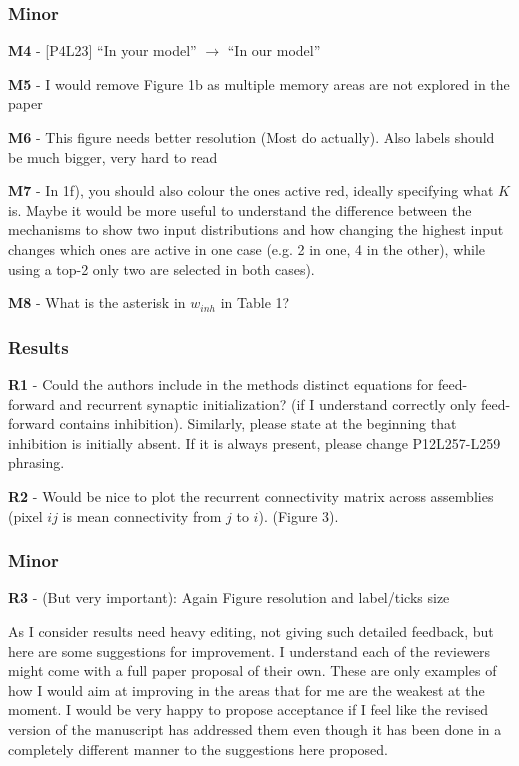 \documentclass[a4paper, 11pt]{article}
\begin{document}
\subsubsection*{Minor}
\textbf{M4} - [P4L23] ``In your model'' $\rightarrow$ ``In our model''

\textbf{M5} - I would remove Figure 1b as multiple memory areas are not explored in the paper

\textbf{M6} - This figure needs better resolution (Most do actually). Also labels should be much bigger, very hard to read

\textbf{M7} - In 1f), you should also colour the ones active red, ideally specifying what $K$ is. Maybe it would be more useful to understand the difference between the mechanisms to show two input distributions and how changing the highest input changes which ones are active in one case (e.g. 2 in one, 4 in the other), while using a top-2 only two are selected in both cases).

\textbf{M8} - What is the asterisk in $w_{inh}$ in Table 1?

\subsubsection*{Results}
\textbf{R1} - Could the authors include in the methods distinct equations for feed-forward and recurrent synaptic initialization? (if I understand correctly only feed-forward contains inhibition). Similarly, please state at the beginning that inhibition is initially absent. If it is always present, please change P12L257-L259 phrasing.

\textbf{R2} - Would be nice to plot the recurrent connectivity matrix across assemblies (pixel $ij$ is mean connectivity from $j$ to $i$). (Figure 3).

\subsubsection*{Minor}
\textbf{R3} - (But very important): Again Figure resolution and label/ticks size

As I consider results need heavy editing, not giving such detailed feedback, but here are some suggestions for improvement. I understand each of the reviewers might come with a full paper proposal of their own. These are only examples of how I would aim at improving in the areas that for me are the weakest at the moment. I would be very happy to propose acceptance if I feel like the revised version of the manuscript has addressed them even though it has been done in a completely different manner to the suggestions here proposed.
\end{document}
